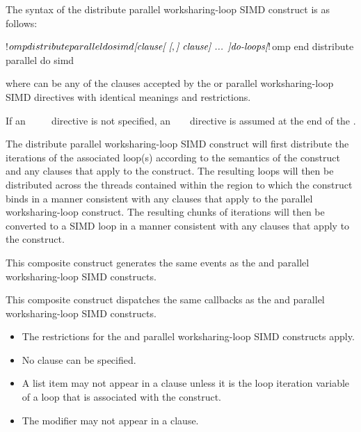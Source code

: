 \begin{fortranspecific}
The syntax of the distribute parallel worksharing-loop SIMD construct is as follows:

\begin{ompfPragma}
!$omp distribute parallel do simd \plc{[clause[ [},\plc{] clause] ... ]}
    \plc{do-loops}
\plc{[}!$omp end distribute parallel do simd\plc{]}
\end{ompfPragma}

where  can be any of the clauses accepted by the  
or parallel worksharing-loop SIMD directives with identical meanings and restrictions.

If an ~~~~ directive 
is not specified, an ~  ~
directive is assumed at the end of the .
\end{fortranspecific}

\descr
The distribute parallel worksharing-loop SIMD construct will first distribute 
the iterations of the associated loop(s) according to the semantics of the 
 construct and any clauses that apply to the  
construct. The resulting loops will then be distributed across the threads 
contained within the  region to which the  
construct binds in a manner consistent with any clauses that apply to the
parallel worksharing-loop construct. The resulting chunks of iterations 
will then be converted to a SIMD loop in a manner consistent with any 
clauses that apply to the  construct.

\events

This composite construct generates the same events as the  
and parallel worksharing-loop SIMD constructs.

\tools

This composite construct dispatches the same callbacks as the  
and parallel worksharing-loop SIMD constructs.

\restrictions
\begin{itemize}
\item The restrictions for the  and parallel worksharing-loop 
      SIMD constructs apply.
\item No  clause can be specified.
\item A list item may not appear in a  clause unless it is the
      loop iteration variable of a loop that is associated with the construct.
\item The  modifier may not appear in a  clause.
\end{itemize}

